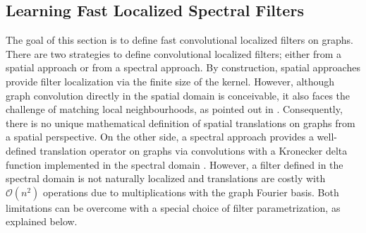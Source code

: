 \documentclass{article}
\newcommand{\bO}{\mathcal{O}}
\begin{document}
\subsection{Learning Fast Localized Spectral Filters} \label{sec:filters}
The goal of this section is to define fast convolutional localized filters on graphs. There are two strategies to define convolutional localized filters; either from a spatial approach or from a spectral approach. By construction, spatial approaches provide filter localization via the finite size of the kernel. However, although graph convolution directly in the spatial domain is conceivable, it also faces the challenge of matching local neighbourhoods, as pointed out in \cite{art:BrunaZarembaSzlamLeCun13DLgraphs}. Consequently, there is no unique mathematical definition of spatial translations on graphs from a spatial perspective. On the other side, a spectral approach provides a well-defined translation operator on graphs via convolutions with a Kronecker delta function implemented in the spectral domain
\cite{art:ShumanNarangFrossardOrtegaVandergheynst13ReviewSPG}. However, a filter defined in the spectral domain is not naturally localized and translations are costly with $\bO(n^2)$ operations due to multiplications with the graph Fourier basis. Both limitations can be overcome with a special choice of filter parametrization, as explained below.



\end{document}
